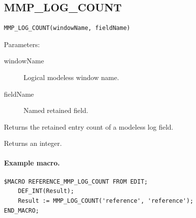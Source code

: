 \documentclass[a4paper,10pt,twoside,openany]{book}
\newenvironment{mrmacextension}{\begin{changebar}}{\end{changebar}}
\begin{document}
\begin{mrmacextension}
\label{prim:intrinsic-mmp-log-count}
\subsection*{MMP\_LOG\_COUNT}
\begin{verbatim}
MMP_LOG_COUNT(windowName, fieldName)
\end{verbatim}
Parameters:
\begin{description}
\item[windowName] Logical modeless window name.
\item[fieldName] Named retained field.
\end{description}

Returns the retained entry count of a modeless log field.

Returns an integer.

\paragraph{Example macro.}
\begin{verbatim}
$MACRO REFERENCE_MMP_LOG_COUNT FROM EDIT;
    DEF_INT(Result);
    Result := MMP_LOG_COUNT('reference', 'reference');
END_MACRO;
\end{verbatim}
\end{mrmacextension}
\end{document}
